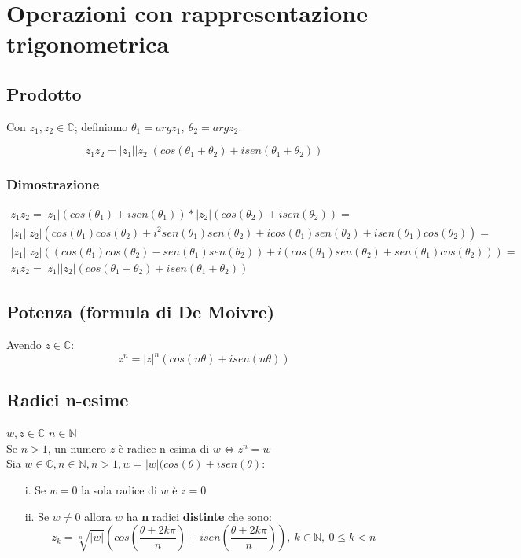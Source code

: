 \section{Operazioni con rappresentazione trigonometrica}
\subsection{Prodotto}
Con $z_1,z_2 \in \mathbb{C}$; definiamo $\theta_1 = argz_1,\ \theta_2=argz_2$:

\begin{equation}
z_1z_2=|z_1||z_2|(cos(\theta_1+\theta_2)+isen(\theta_1+\theta_2))
\end{equation}

\subsubsection{Dimostrazione}
\begin{equation*}
\begin{gathered}
z_1z_2=|z_1|(cos(\theta_1)+isen(\theta_1)) * |z_2|(cos(\theta_2)+isen(\theta_2)) =\\
|z_1||z_2|(cos(\theta_1)cos(\theta_2) + i^2sen(\theta_1)sen(\theta_2) + icos(\theta_1)sen(\theta_2) + isen(\theta_1)cos(\theta_2)) =\\
|z_1||z_2|((cos(\theta_1)cos(\theta_2)-sen(\theta_1)sen(\theta_2)) + i(cos(\theta_1)sen(\theta_2) + sen(\theta_1)cos(\theta_2))) =\\
z_1z_2=|z_1||z_2|(cos(\theta_1+\theta_2)+isen(\theta_1+\theta_2))
\end{gathered}
\end{equation*}

\subsection{Potenza (formula di De Moivre)}
Avendo $z \in \mathbb{C}$:\\
\begin{equation}
z^n = |z|^n(cos(n\theta)+isen(n\theta))
\end{equation}
\subsection{Radici n-esime}
$w,z \in \mathbb{C}$\; $n \in \mathbb{N}$\\
Se $n>1$, un numero $z$ è radice n-esima di $w \iff z^n=w$\\
Sia $w \in \mathbb{C}, n \in \mathbb{N}, n>1, w=|w|(cos(\theta)+isen(\theta)$:\\
\begin{enumerate}
\item[i.] Se $w=0$ la sola radice di $w$ è $z=0$
\item[ii.] Se $w\neq0$ allora $w$ ha \textbf{n} radici \textbf{distinte} che sono:\\
\begin{equation}
z_k=\sqrt[n]{|w|}(cos(\frac{\theta+2k\pi}{n})+isen(\frac{\theta+2k\pi}{n})),\ k \in \mathbb{N},\ 0\leq k<n
\end{equation}
\end{enumerate}

